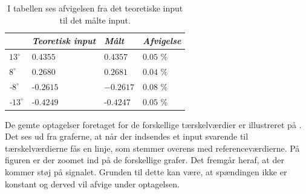 \begin{table}[H]
\centering
\begin{tabular}{|l|l|l|l|} \hline
             & \textit{Teoretisk input} & \textit{Målt} 	& \textit{Afvigelse} \\ \hline
\textit{$13^{\circ}$}  & $0.4355$          & $0.4357$  & $0.05$ \% \\ \hline
\textit{$8^{\circ}$}   & $0.2680$          & $0.2681$  & $0.04$ \% \\ \hline
\textit{-$8^{\circ}$}  & -$0.2615$         & $-0.2617$ & $0.08$ \%  \\ \hline
\textit{-$13^{\circ}$} & -$0.4249$         & -$0.4247$ & $0.05$ \% \\ \hline    
\end{tabular}
\caption{I tabellen ses afvigelsen fra det teoretiske input til det målte input.}
\label{Tab:afvigelse_software}
\end{table}
\noindent De gemte optagelser foretaget for de forskellige tærskelværdier er illustreret på . Det ses ud fra graferne, at når der indsendes et input svarende til tærskelværdierne fås en linje, som stemmer overens med referenceværdierne. På figuren er der zoomet ind på de forskellige grafer. Det fremgår heraf, at der kommer støj på signalet. Grunden til dette kan være, at spændingen ikke er konstant og derved vil afvige under optagelsen. 
